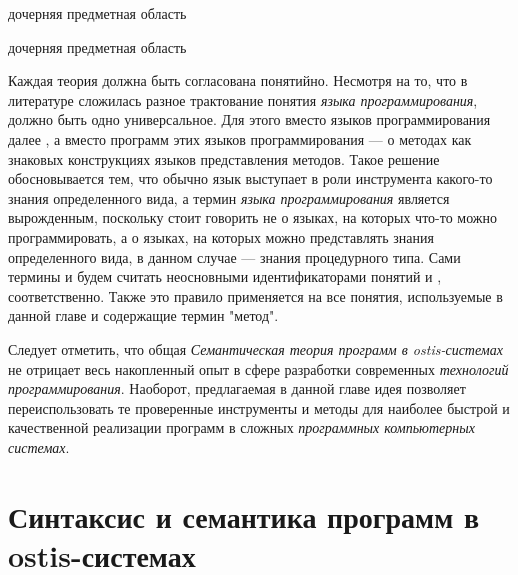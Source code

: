 \begin{SCn}
\begin{scnrelfromlist}{дочерняя предметная область}
    \begin{scnindent}
        \begin{scnrelfromlist}{дочерняя предметная область}
        \end{scnrelfromlist}
    \end{scnindent}
\end{scnrelfromlist}
\end{SCn}

Каждая теория должна быть согласована понятийно. Несмотря на то, что в литературе сложилась разное трактование понятия \textit{языка программирования}, должно быть одно универсальное. Для этого вместо языков программирования далее , а вместо программ этих языков программирования --- о методах как знаковых конструкциях языков представления методов. Такое решение обосновывается тем, что обычно язык выступает в роли инструмента какого-то знания определенного вида, а термин \textit{языка программирования} является вырожденным, поскольку стоит говорить не о языках, на которых что-то можно программировать, а о языках, на которых можно представлять знания определенного вида, в данном случае --- знания процедурного типа. Сами термины  и  будем считать неосновными идентификаторами понятий  и , соответственно. Также это правило применяется на все понятия, используемые в данной главе и содержащие термин "метод".

Следует отметить, что общая \textit{Семантическая теория программ в ostis-системах} не отрицает весь накопленный опыт в сфере разработки современных \textit{технологий программирования}. Наоборот, предлагаемая в данной главе идея позволяет переиспользовать те проверенные инструменты и методы для наиболее быстрой и качественной реализации программ в сложных \textit{программных компьютерных системах}.

\section{Синтаксис и семантика программ в ostis-системах}
\label{sec_programs_method_syntax_and_semantic}

